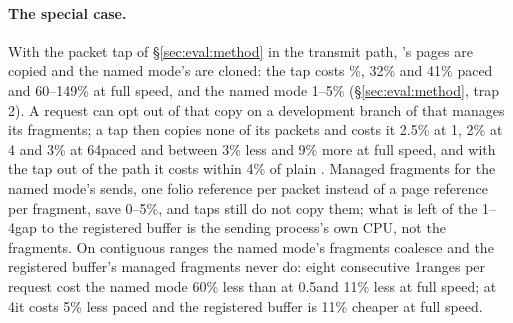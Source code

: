 \paragraph{The special case.} With the packet tap of \S\ref{sec:eval:method} in the transmit
path, \sendzc's pages are copied and the named mode's are cloned: the tap costs \%, 32\% and 41\% paced and 60--149\% at full speed, and the named mode 1--5\%
(\S\ref{sec:eval:method}, trap 2). %
A \sendzc request can opt out of that copy on a development branch of \iouring that manages
its fragments; a tap then copies none of its packets and costs it 2.5\% at 1\KiB, 2\% at 4\KiB
and 3\% at 64\KiB paced and between 3\% less and 9\% more at full speed, and with the tap out
of the path it costs within 4\% of plain \sendzc. Managed fragments for
the named mode's sends, one folio reference per packet instead of a page reference per
fragment, save 0--5\%, and taps still do not copy them; what is left of the 1--4\KiB gap to
the registered buffer is the sending process's own CPU, not the fragments.
On contiguous ranges the named mode's fragments coalesce and the registered buffer's
managed fragments never do: eight consecutive 1\KiB ranges per request cost the named mode 60\%
less than \sendzc at 0.5\GBs and 11\% less at full speed; at 4\KiB it costs 5\% less paced and
the registered buffer is 11\% cheaper at full speed. %

